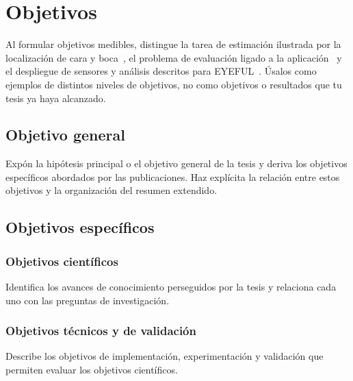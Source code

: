 %

\chapter{Objetivos}
\label{cha:compendium-objectives}

Al formular objetivos medibles, distingue la tarea de estimación ilustrada por la localización de cara y boca~\cite{Sanabria2026Landmark}, el problema de evaluación ligado a la aplicación~\cite{nieva2024proposal} y el despliegue de sensores y análisis descritos para EYEFUL~\cite{nieva2023eyeful}. Úsalos como ejemplos de distintos niveles de objetivos, no como objetivos o resultados que tu tesis ya haya alcanzado.

\section{Objetivo general}

Expón la hipótesis principal o el objetivo general de la tesis y deriva los objetivos específicos abordados por las publicaciones. Haz explícita la relación entre estos objetivos y la organización del resumen extendido.

\section{Objetivos específicos}
\subsection{Objetivos científicos}

Identifica los avances de conocimiento perseguidos por la tesis y relaciona cada uno con las preguntas de investigación.

\subsection{Objetivos técnicos y de validación}

Describe los objetivos de implementación, experimentación y validación que permiten evaluar los objetivos científicos.

